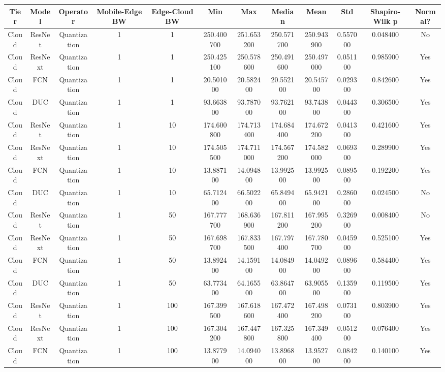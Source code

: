 \begin{tabular}{|c||c||c||c||c||c||c||c||c||c||c||c|}
\toprule
Tier & Model & Operator & Mobile-Edge BW & Edge-Cloud BW & Min & Max & Median & Mean & Std & Shapiro-Wilk p & Normal? \\
\midrule
Cloud & ResNet & Quantization & 1 & 1 & 250.400700 & 251.653200 & 250.571700 & 250.943900 & 0.557000 & 0.048400 & No \\
Cloud & ResNext & Quantization & 1 & 1 & 250.425100 & 250.578600 & 250.491600 & 250.497000 & 0.051100 & 0.985900 & Yes \\
Cloud & FCN & Quantization & 1 & 1 & 20.501000 & 20.582400 & 20.552100 & 20.545700 & 0.029300 & 0.842600 & Yes \\
Cloud & DUC & Quantization & 1 & 1 & 93.663800 & 93.787000 & 93.762100 & 93.743800 & 0.044300 & 0.306500 & Yes \\
Cloud & ResNet & Quantization & 1 & 10 & 174.600800 & 174.713400 & 174.684400 & 174.672200 & 0.041300 & 0.421600 & Yes \\
Cloud & ResNext & Quantization & 1 & 10 & 174.505500 & 174.711000 & 174.567200 & 174.582000 & 0.069300 & 0.289900 & Yes \\
Cloud & FCN & Quantization & 1 & 10 & 13.887100 & 14.094800 & 13.992500 & 13.992500 & 0.089500 & 0.192200 & Yes \\
Cloud & DUC & Quantization & 1 & 10 & 65.712400 & 66.502200 & 65.849400 & 65.942100 & 0.286000 & 0.024500 & No \\
Cloud & ResNet & Quantization & 1 & 50 & 167.777700 & 168.636900 & 167.811200 & 167.995200 & 0.326900 & 0.008400 & No \\
Cloud & ResNext & Quantization & 1 & 50 & 167.698700 & 167.833500 & 167.797400 & 167.780700 & 0.045900 & 0.525100 & Yes \\
Cloud & FCN & Quantization & 1 & 50 & 13.892400 & 14.159100 & 14.084900 & 14.049200 & 0.089600 & 0.584400 & Yes \\
Cloud & DUC & Quantization & 1 & 50 & 63.773400 & 64.165500 & 63.864700 & 63.905500 & 0.135900 & 0.119500 & Yes \\
Cloud & ResNet & Quantization & 1 & 100 & 167.399500 & 167.618600 & 167.472400 & 167.498200 & 0.073100 & 0.803900 & Yes \\
Cloud & ResNext & Quantization & 1 & 100 & 167.304200 & 167.447800 & 167.325800 & 167.349400 & 0.051200 & 0.076400 & Yes \\
Cloud & FCN & Quantization & 1 & 100 & 13.877900 & 14.094000 & 13.896800 & 13.952700 & 0.084200 & 0.140100 & Yes \\

\end{tabular}
